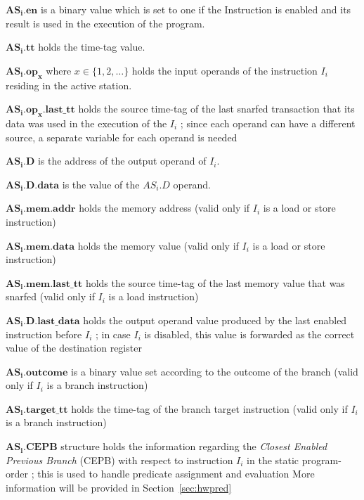 \documentclass[10pt,twocolumn]{IEEEtran}
\begin{document}
\begin{list}{\mbox{}}
\item
\item $\mathbf{AS_i.en}$ is a binary value which is set 
to one if the Instruction is enabled
and its result is used in the execution of the program.
\item $\mathbf{AS_i.tt}$ holds the time-tag value.
\item $\mathbf{AS_i.op_x}$ where $x \in \{1,2,\ldots\}$ holds the 
input operands of
the instruction $I_i$ residing in the active station.
\item $\mathbf{AS_i.op_x.last\_tt}$ holds the source time-tag 
of the last snarfed
transaction that its data was used in the 
execution of the $I_i$ ;
since each operand
can have a different source, a separate variable for each operand is needed
\item $\mathbf{AS_i.D}$ is the address of the output operand of $I_i$.
\item $\mathbf{AS_i.D.data}$ is the value of the $AS_i.D$ operand.
\item $\mathbf{AS_i.mem.addr}$ holds the memory 
address (valid only if $I_i$ is a load or store instruction)
\item $\mathbf{AS_i.mem.data}$ holds the memory 
value (valid only if $I_i$ is a load or store instruction)
\item $\mathbf{AS_i.mem.last\_tt}$ holds the source time-tag 
of the last memory
value that was snarfed (valid only if $I_i$ is a load instruction)
\item $\mathbf{AS_i.D.last\_data}$ holds the output operand value 
produced by the
last enabled instruction before $I_i$ ; in case $I_i$ is disabled, 
this value is
forwarded as the correct value of the destination register
\item $\mathbf{AS_i.outcome}$ is a binary value set according to 
the outcome of the branch
(valid only if $I_i$ is a branch instruction)
\item $\mathbf{AS_i.target\_tt}$ holds the time-tag of the branch 
target instruction
(valid only if $I_i$ is a branch instruction)
\item $\mathbf{AS_i.CEPB}$ structure holds the information 
regarding the \emph{Closest Enabled Previous Branch} (CEPB)
with respect to instruction $I_i$ in
the static program-order ; this is used to handle predicate assignment and 
evaluation
More information will be provided in Section~\ref{sec:hwpred}
\end{list}
%
\vspace{0.2 in}
\end{document}
